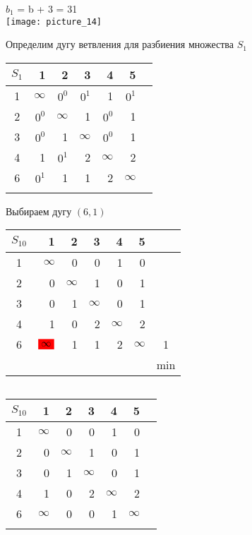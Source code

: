 \documentclass[12pt]{article}
\begin{document}
$b_1$ = b + 3 = 31\\

\texttt{[image: picture\_14]}

Определим дугу ветвления для разбиения множества $S_1$

\begin{flushleft}
\begin{tabular}{c||rrrrr||c}
$S_1$ & 1 & 2 & 3 & 4 & 5 & \\
\hline
\hline
1 & $\infty$ & $0^0$ & $0^1$  & 1 & $0^1$ & \\
2 & $0^0$ & $\infty$ & 1  & $0^0$ & 1 & \\
3 & $0^0$ & 1 & $\infty$  & $0^0$ & 1 & \\
4 & 1 & $0^1$ & 2  & $\infty$ & 2 & \\
6 & $0^1$ & 1 & 1  & 2 & $\infty$ & \\
\hline
\hline
 & &  &  &  & & \\
\end{tabular}
\end{flushleft}

Выбираем дугу $(6,1)$ 

\begin{flushleft}
\begin{tabular}{c||rrrrr||c}
$S_{10}$ & 1 & 2 & 3 & 4 & 5 & \\
\hline
\hline
1 & $\infty$ & 0 & 0  & 1 & 0 & \\
2 & 0 & $\infty$ & 1  & 0 & 1 & \\
3 & 0 & 1 & $\infty$  & 0 & 1 & \\
4 & 1 & 0 & 2  & $\infty$ & 2 & \\
6 & $\colorbox{red}{$\infty$}$ & 1 & 1  & 2 & $\infty$ & 1\\
\hline
\hline
 &  &  &  &  & & min \\
\end{tabular}
$\qquad $  
\begin{tabular}{c||rrrrr||c}
$S_{10}$ & 1 & 2 & 3 & 4 & 5 & \\
\hline
\hline
1 & $\infty$ & 0 & 0  & 1 & 0 & \\
2 & 0 & $\infty$ & 1  & 0 & 1 & \\
3 & 0 & 1 & $\infty$  & 0 & 1 & \\
4 & 1 & 0 & 2  & $\infty$ & 2 & \\
    6 & $\infty$ & 0 & 0  & 1 & $\infty$ & \\
\hline
\hline
 & &  &  &  & & \\
\end{tabular}
\end{flushleft}
\end{document}
